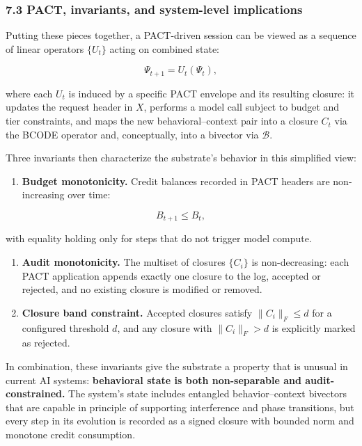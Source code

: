 \subsubsection{7.3 PACT, invariants, and system-level
implications}\label{pact-invariants-and-system-level-implications}

Putting these pieces together, a PACT-driven session can be viewed as a
sequence of linear operators \(\{U_t\}\) acting on combined state:

\[
\Psi_{t+1} = U_t(\Psi_t),
\]

where each \(U_t\) is induced by a specific PACT envelope and its
resulting closure: it updates the request header in \(X\), performs a
model call subject to budget and tier constraints, and maps the new
behavioral--context pair into a closure \(C_t\) via the BCODE operator
and, conceptually, into a bivector via \(\mathcal{B}\).

Three invariants then characterize the substrate's behavior in this
simplified view:

\begin{enumerate}
\def\labelenumi{\arabic{enumi}.}
\tightlist
\item
  \textbf{Budget monotonicity.} Credit balances recorded in PACT headers
  are non-increasing over time:
\end{enumerate}

\[
B_{t+1} \le B_t,
\]

with equality holding only for steps that do not trigger model compute.

\begin{enumerate}
\def\labelenumi{\arabic{enumi}.}
\setcounter{enumi}{1}
\item
  \textbf{Audit monotonicity.} The multiset of closures \(\{C_i\}\) is
  non-decreasing: each PACT application appends exactly one closure to
  the log, accepted or rejected, and no existing closure is modified or
  removed.
\item
  \textbf{Closure band constraint.} Accepted closures satisfy
  \(\|C_i\|_F \le d\) for a configured threshold \(d\), and any closure
  with \(\|C_i\|_F > d\) is explicitly marked as rejected.
\end{enumerate}

In combination, these invariants give the substrate a property that is
unusual in current AI systems: \textbf{behavioral state is both
non-separable and audit-constrained.} The system's state includes
entangled behavior--context bivectors that are capable in principle of
supporting interference and phase transitions, but every step in its
evolution is recorded as a signed closure with bounded norm and monotone
credit consumption.


